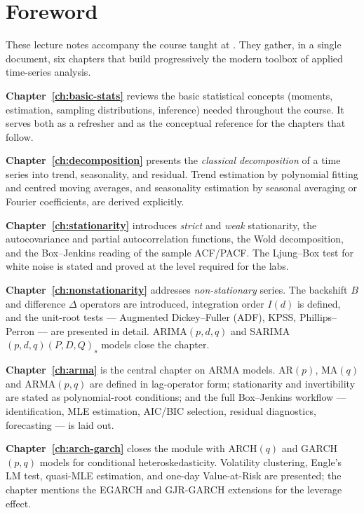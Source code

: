 \documentclass[a4paper,11pt,oneside]{book}
\begin{document}
\chapter*{Foreword}
\pagestyle{fancy}

These lecture notes accompany the \emph{\moduleNom} course taught at
\auteurInstitution. They gather, in a single document, six
chapters that build progressively the modern toolbox of applied
time-series analysis.

\medskip
\textbf{Chapter~\ref{ch:basic-stats}} reviews the basic
statistical concepts (moments, estimation, sampling distributions,
inference) needed throughout the course. It serves both as a
refresher and as the conceptual reference for the chapters that
follow.

\medskip
\textbf{Chapter~\ref{ch:decomposition}} presents the
\emph{classical decomposition} of a time series into trend,
seasonality, and residual. Trend estimation by polynomial fitting
and centred moving averages, and seasonality estimation by
seasonal averaging or Fourier coefficients, are derived
explicitly.

\medskip
\textbf{Chapter~\ref{ch:stationarity}} introduces \emph{strict} and
\emph{weak} stationarity, the autocovariance and partial
autocorrelation functions, the Wold decomposition, and the
Box--Jenkins reading of the sample ACF/PACF. The Ljung--Box test
for white noise is stated and proved at the level required for
the labs.

\medskip
\textbf{Chapter~\ref{ch:nonstationarity}} addresses
\emph{non-stationary} series. The backshift $B$ and difference
$\Delta$ operators are introduced, integration order $I(d)$ is
defined, and the unit-root tests --- Augmented
Dickey--Fuller (ADF), KPSS, Phillips--Perron --- are presented in
detail. ARIMA$(p, d, q)$ and SARIMA$(p, d, q)(P, D, Q)_s$ models
close the chapter.

\medskip
\textbf{Chapter~\ref{ch:arma}} is the central chapter on ARMA
models. AR$(p)$, MA$(q)$ and ARMA$(p, q)$ are defined in lag-operator
form; stationarity and invertibility are stated as polynomial-root
conditions; and the full Box--Jenkins workflow ---
identification, MLE estimation, AIC/BIC selection, residual
diagnostics, forecasting --- is laid out.

\medskip
\textbf{Chapter~\ref{ch:arch-garch}} closes the module with
ARCH$(q)$ and GARCH$(p, q)$ models for conditional
heteroskedasticity. Volatility clustering, Engle's LM test,
quasi-MLE estimation, and one-day Value-at-Risk are presented;
the chapter mentions the EGARCH and GJR-GARCH extensions for the
leverage effect.
\end{document}
